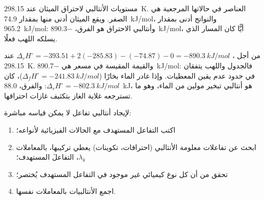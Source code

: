 \begin{omfigure}

{\small مستويات الأنتالبي لاحتراق الميثان عند \qty{298.15}{K}. العناصر في
حالاتها المرجعية هي الصفر. ويقع الميثان أدنى منها بمقدار
\qty{74.9}{kJ/mol}، والنواتج أدنى بمقدار \qty{965.2}{kJ/mol}: وأنتالبي
الاحتراق هو الفرق، \qty{-890.3}{kJ/mol}، أيًّا كان المسار الذي يسلكه اللهب
فعلًا.}
\end{omfigure}

\begin{example}\label{ex:b2:reaction-enthalpy:methane}
من أجل ،
$\Delta_r H^\circ = -393.51 + 2(-285.83) - (-74.87) - 0 =
\qty{-890.3}{kJ/mol}$ عند \qty{298.15}{K}. والقيمة المقيسة في مسعر هي
\qty{-890.7}{kJ/mol}: فالجدول واللهب يتفقان في حدود عدم يقين المعطيات.
وإذا غادر الماء بخارًا
($\Delta_f H^\circ = \qty{-241.83}{kJ/mol}$)، كان $\Delta_r H^\circ =
\qty{-802.3}{kJ/mol}$: والفرق، \qty{88.0}{kJ}، هو أنتالبي تبخير مولين من
الماء، وهو ما تسترجعه غلاية الغاز بتكثيف غازات احتراقها.
\end{example}

\begin{method}[دورة هس]\label{met:b2:reaction-enthalpy:hess-cycle}
لإيجاد أنتالبي تفاعل لا يمكن قياسه مباشرة:
\begin{enumerate}
  \item اكتب التفاعل المستهدف مع الحالات الفيزيائية لأنواعه؛
  \item ابحث عن تفاعلات معلومة الأنتالبي (احتراقات، تكوينات) يعطي
        تركيبها، بالمعاملات $\lambda_k$، التفاعلَ المستهدف؛
  \item تحقق من أن كل نوع كيميائي غير موجود في التفاعل المستهدف يُختصر؛
  \item اجمع الأنتالبيات بالمعاملات نفسها.
\end{enumerate}
\end{method}


